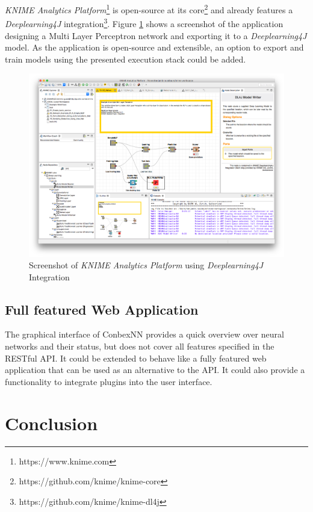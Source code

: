 \emph{KNIME Analytics Platform}\footnote{https://www.knime.com} is
open-source at its core\footnote{https://github.com/knime/knime-core}
and already features a \emph{Deeplearning4J} integration\footnote{https://github.com/knime/knime-dl4j}.
Figure \ref{knime} shows a screenshot of the application designing a
Multi Layer Perceptron network and exporting it to a
\emph{Deeplearning4J} model. As the application is open-source and
extensible, an option to export and train models using the presented
execution stack could be added.

\begin{figure}
\centering
\includegraphics[width=17.00000cm]{images/knime}
\caption{Screenshot of \emph{KNIME Analytics Platform} using
\emph{Deeplearning4J} Integration \label{knime}}
\end{figure}

\section{Full featured Web
Application}\label{full-featured-web-application}

The graphical interface of ConbexNN provides a quick overview over
neural networks and their status, but does not cover all features
specified in the RESTful API. It could be extended to behave like a
fully featured web application that can be used as an alternative to the
API. It could also provide a functionality to integrate plugins into the
user interface.

\chapter{Conclusion}\label{conclusion}

